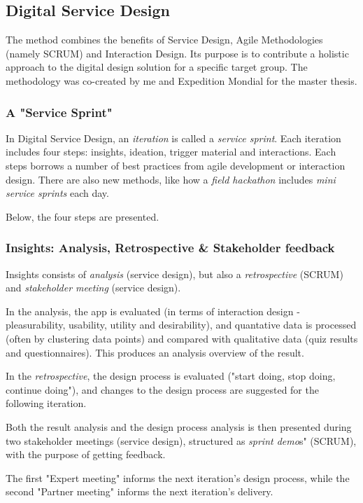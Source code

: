 \subsection{Digital Service Design}

The method combines the benefits of Service Design, Agile Methodologies (namely SCRUM) and Interaction Design. Its purpose is to contribute a holistic approach to the digital design solution for a specific target group. The methodology was co-created by me and Expedition Mondial for the master thesis. \citep{nissar}

\subsubsection{A "Service Sprint"}
In Digital Service Design, an \textit{iteration} is called a \textit{service sprint}. Each iteration includes four steps: insights, ideation, trigger material and interactions. Each steps borrows a number of best practices from agile development or interaction design. There are also new methods, like how a \textit{field hackathon} includes \textit{mini service sprints} each day.

Below, the four steps are presented.

\subsubsection{Insights: Analysis, Retrospective \& Stakeholder feedback}
  Insights consists of \textit{analysis} (service design), but also a \textit{retrospective} (SCRUM) and \textit{stakeholder meeting} (service design).

    In the analysis, the app is evaluated (in terms of interaction design - pleasurability, usability, utility and desirability), and quantative data is processed (often by clustering data points) and compared with qualitative data (quiz results and questionnaires). This produces an analysis overview of the result.

    In the \textit{retrospective}, the design process is evaluated ("start doing, stop doing, continue doing"), and changes to the design process are suggested for the following iteration.

    Both the result analysis and the design process analysis is then presented during two stakeholder meetings (service design), structured as \textit{sprint demo}s" (SCRUM), with the purpose of getting feedback.

    The first "Expert meeting" informs the next iteration's design process, while the second "Partner meeting" informs the next iteration's delivery.

